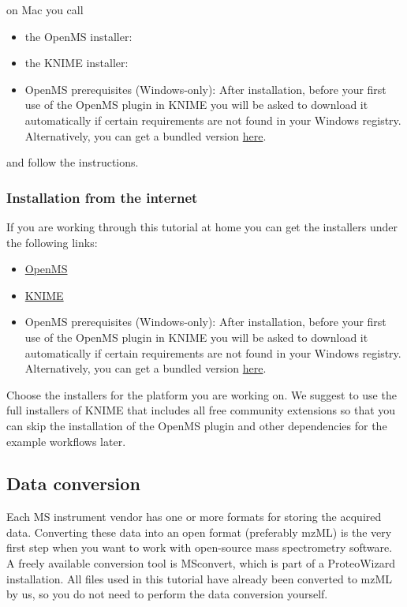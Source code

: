 on Mac you call
\begin{itemize}
  \item the OpenMS installer: \directory{\MacOpenMSInstallerName}
  \item the KNIME installer: \directory{\MacKnimeInstallerName}
  \item OpenMS prerequisites (Windows-only): After installation, before your first use of the OpenMS plugin in KNIME you will be asked to download it automatically if certain requirements are not found in your Windows registry. Alternatively, you can get a bundled version \href{\WindowsPrerequisitesLink}{here}.
\end{itemize}

and follow the instructions. 

\subsubsection{Installation from the internet}
If you are working through this tutorial at home you can get the installers under the following links:
\begin{itemize}
  \item \href{http://www.openms.de/downloads}{OpenMS}
  \item \href{https://www.knime.org/downloads/overview}{KNIME}
  \item OpenMS prerequisites (Windows-only): After installation, before your first use of the OpenMS plugin in KNIME you will be asked to download it automatically if certain requirements are not found in your Windows registry. Alternatively, you can get a bundled version \href{\WindowsPrerequisitesLink}{here}.
\end{itemize}
Choose the installers for the platform you are working on. We suggest to use the full installers of KNIME that includes all free community extensions so that you can skip the installation of the OpenMS plugin and other dependencies for the example workflows later.

\subsection{Data conversion}
\label{Data_Conversion}

Each MS instrument vendor has one or more formats for storing the acquired data. Converting these data into an open format (preferably mzML) is the very first step when you want to work with open-source mass spectrometry software. A freely available conversion tool is MSconvert, which is part of a ProteoWizard installation. All files used in this tutorial have already been converted to mzML by us, so you do not need to perform the data conversion yourself.

